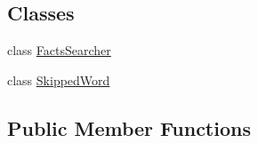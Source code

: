 \subsection*{Classes}
\begin{DoxyCompactItemize}
\item 
class \hyperlink{classit_1_1emarolab_1_1cagg_1_1core_1_1evaluation_1_1inputFormatting_1_1ThreadedInputFormatter_1_1FactsSearcher}{Facts\-Searcher}
\item 
class \hyperlink{classit_1_1emarolab_1_1cagg_1_1core_1_1evaluation_1_1inputFormatting_1_1ThreadedInputFormatter_1_1SkippedWord}{Skipped\-Word}
\end{DoxyCompactItemize}
\subsection*{Public Member Functions}
